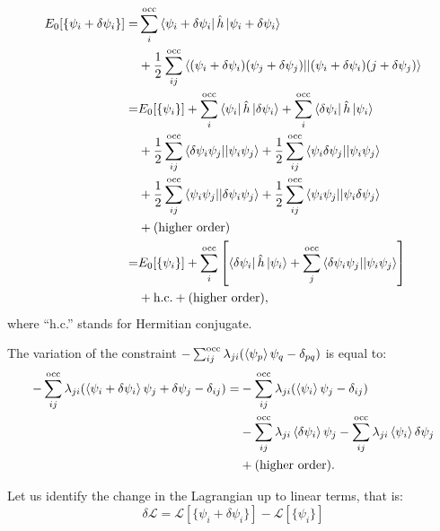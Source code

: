 \documentclass[../Main/chem532-notes.tex]{subfiles}
\begin{document}
\begin{equation}
\begin{split}
E_0[\{ \psi_i +  \delta \psi_i\}] =&
\sum_i^{\rm occ} \bra{\psi_i + \delta \psi_i} \hat{h} \ket{\psi_i + \delta \psi_i} \\
&+ \frac{1}{2} \sum_{ij}^{\rm occ} \bra{(\psi_i + \delta \psi_i) (\psi_j + \delta \psi_j)}\!\ket{(\psi_i + \delta \psi_i) (j + \delta \psi_j)} \\
=& E_0[\{ \psi_i \}] + \sum_i^{\rm occ} \bra{\psi_i} \hat{h} \ket{\delta \psi_i}
+ \sum_i^{\rm occ} \bra{\delta \psi_i} \hat{h} \ket{\psi_i} \\
&+ \frac{1}{2} \sum_{ij}^{\rm occ} \bra{\delta \psi_i \psi_j}\!\ket{\psi_i \psi_j}
+ \frac{1}{2} \sum_{ij}^{\rm occ} \bra{\psi_i \delta \psi_j}\!\ket{\psi_i \psi_j} \\
&+ \frac{1}{2} \sum_{ij}^{\rm occ} \bra{\psi_i \psi_j}\!\ket{\delta \psi_i \psi_j}
+ \frac{1}{2} \sum_{ij}^{\rm occ} \bra{\psi_i \psi_j}\!\ket{\psi_i \delta \psi_j}\\
&+ \text{(higher order)} \\
=& E_0[\{ \psi_i \}] + \sum_i^{\rm occ} \left[ \bra{\delta \psi_i} \hat{h} \ket{\psi_i} 
+ \sum_{j}^{\rm occ} \bra{\delta \psi_i \psi_j}\!\ket{\psi_i \psi_j} \right]\\&+ \text{h.c.} + \text{(higher order)},
\end{split}
\end{equation}
where ``h.c.'' stands for Hermitian conjugate.

The variation of the constraint $- \sum_{ij}^\mathrm{occ} \lambda_{ji} (\braket{\psi_p}{\psi_q} - \delta_{pq})$ is equal to:
\begin{equation}
\begin{split}
- \sum_{ij}^\mathrm{occ} \lambda_{ji} (\braket{\psi_i + \delta \psi_i}{\psi_j + \delta \psi_j} - \delta_{ij})
=& - \sum_{ij}^\mathrm{occ} \lambda_{ji} (\braket{\psi_i}{\psi_j} - \delta_{ij}) \\
& - \sum_{ij}^\mathrm{occ} \lambda_{ji} \braket{\delta\psi_i}{\psi_j}  - \sum_{ij}^\mathrm{occ} \lambda_{ji} \braket{\psi_i}{\delta\psi_j} \\
&+ \text{(higher order)}.
\end{split}
\end{equation}

Let us identify the change in the Lagrangian up to linear terms, that is:
\begin{equation}
\delta \mathcal{L} = \mathcal{L}[\{ \psi_i  + \delta \psi_i \}] - \mathcal{L}[\{ \psi_i  \}]
\end{equation}
\end{document}
